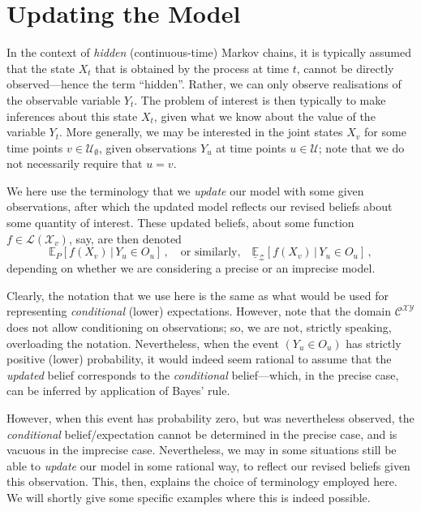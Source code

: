 \documentclass[twoside,11pt]{article}
\newcommand{\states}{\mathcal{X}}
\newcommand{\observs}{\mathcal{Y}}
\newcommand{\gambles}{\mathcal{L}}
\begin{document}
\section{Updating the Model}\label{sec:updating_model}

In the context of \emph{hidden} (continuous-time) Markov chains, it is typically assumed that the state $X_t$ that is obtained by the process at time $t$, cannot be directly observed---hence the term ``hidden''. Rather, we can only observe realisations of the observable variable $Y_t$. The problem of interest is then typically to make inferences about this state $X_t$, given what we know about the value of the variable $Y_t$. More generally, we may be interested in the joint states $X_v$ for some time points $v\in\mathcal{U}_\emptyset$, given observations $Y_u$ at time points $u\in\mathcal{U}$; note that we do not necessarily require that $u=v$.

We here use the terminology that we \emph{update} our model with some given observations, after which the updated model reflects our revised beliefs about some quantity of interest. These updated beliefs, about some function $f\in\gambles(\states_v)$, say, are then denoted
\begin{equation*}
\mathbb{E}_P[f(X_v)\,\vert\,Y_u\in O_u]\,,\quad\text{or similarly,}\quad\underline{\mathbb{E}}_\mathcal{Z}[f(X_v)\,\vert\,Y_u\in O_u]\,,
\end{equation*}
depending on whether we are considering a precise or an imprecise model.

Clearly, the notation that we use here is the same as what would be used for representing \emph{conditional} (lower) expectations. However, note that the domain $\mathcal{C}^{\states\observs}$ does not allow conditioning on observations; so, we are not, strictly speaking, overloading the notation. Nevertheless, when the event $(Y_u\in O_u)$ has strictly positive (lower) probability, it would indeed seem rational to assume that the \emph{updated} belief corresponds to the \emph{conditional} belief---which, in the precise case, can be inferred by application of Bayes' rule. 

However, when this event has probability zero, but was nevertheless observed, the \emph{conditional} belief/expectation cannot be determined in the precise case, and is vacuous in the imprecise case. Nevertheless, we may in some situations still be able to \emph{update} our model in some rational way, to reflect our revised beliefs given this observation. This, then, explains the choice of terminology employed here. We will shortly give some specific examples where this is indeed possible.
\end{document}
